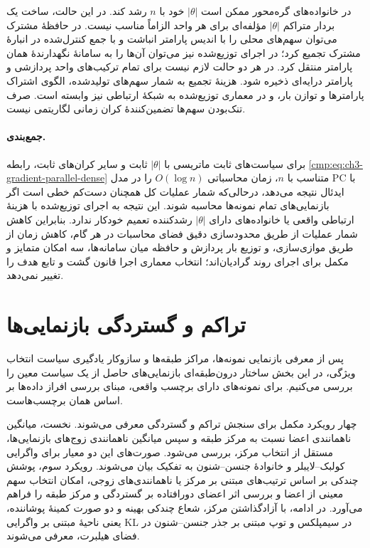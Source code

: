 در خانواده‌های گره‌محور ممکن است $|\theta|$ خود
با $n$ رشد کند. در این حالت، ساخت یک بردار
متراکم $|\theta|$ مؤلفه‌ای برای هر واحد
الزاماً مناسب نیست. در حافظهٔ مشترک می‌توان
سهم‌های محلی را با اندیس پارامتر انباشت
و با جمع کنترل‌شده در انبارهٔ مشترک تجمیع کرد؛
در اجرای توزیع‌شده نیز می‌توان آن‌ها را به
سامانهٔ نگهدارندهٔ همان پارامتر منتقل کرد.
در هر دو حالت لازم نیست برای تمام ترکیب‌های
واحد پردازشی و پارامتر درایه‌ای ذخیره شود.
هزینهٔ تجمیع به شمار سهم‌های تولیدشده،
الگوی اشتراک پارامترها و توازن بار، و در
معماری توزیع‌شده به شبکهٔ ارتباطی نیز
وابسته است. صرف تنک‌بودن سهم‌ها تضمین‌کنندهٔ
کران زمانی لگاریتمی نیست.

\paragraph{جمع‌بندی.}
برای سیاست‌های ثابت ماتریسی با $|\theta|$ ثابت
و سایر کران‌های ثابت، رابطه
\eqref{cmp:eq:ch3-gradient-parallel-dense}
با $\mathrm{PC}$ متناسب با $n$،
زمان محاسباتی $O(\log n)$ را در مدل
ایدئال نتیجه می‌دهد، درحالی‌که شمار
عملیات کل همچنان دست‌کم خطی است اگر
بازنمایی‌های تمام نمونه‌ها محاسبه شوند.
این نتیجه به اجرای توزیع‌شده با هزینهٔ
ارتباطی واقعی یا خانواده‌های دارای
$|\theta|$ رشدکننده تعمیم خودکار ندارد.
بنابراین کاهش شمار عملیات از طریق
محدودسازی دقیق فضای محاسبات در هر گام،
کاهش زمان از طریق موازی‌سازی، و توزیع
بار پردازش و حافظه میان سامانه‌ها، سه
امکان متمایز و مکمل برای اجرای روند
گرادیان‌اند؛ انتخاب معماری اجرا قانون
گشت و تابع هدف را تغییر نمی‌دهد.

\section{تراکم و گستردگی بازنمایی‌ها}
\label{cmp:sec:ch3-quality-criteria}

پس از معرفی بازنمایی نمونه‌ها، مراکز طبقه‌ها و سازوکار
یادگیری سیاست انتخاب ویژگی، در این بخش ساختار
درون‌طبقه‌ای بازنمایی‌های حاصل از یک سیاست معین را
بررسی می‌کنیم. برای نمونه‌های دارای برچسب واقعی،
مبنای بررسی افراز داده‌ها بر اساس همان برچسب‌هاست.

چهار رویکرد مکمل برای سنجش تراکم و گستردگی معرفی
می‌شوند. نخست، میانگین ناهمانندی اعضا نسبت به مرکز
طبقه و سپس میانگین ناهمانندی زوج‌های بازنمایی‌ها،
مستقل از انتخاب مرکز، بررسی می‌شود. صورت‌های این
دو معیار برای واگرایی کولبک--لایبلر و خانوادهٔ
جنسن--شنون به تفکیک بیان می‌شوند. رویکرد سوم،
پوشش چندکی بر اساس ترتیب‌های مبتنی بر مرکز یا
ناهمانندی‌های زوجی، امکان انتخاب سهم معینی از اعضا
و بررسی اثر اعضای دورافتاده بر گستردگی و مرکز طبقه
را فراهم می‌آورد. در ادامه، با آزادگذاشتن مرکز،
شعاع چندکی بهینه و دو صورت کمینهٔ پوشاننده، یعنی
ناحیهٔ مبتنی بر واگرایی KL در سیمپلکس و توپ
مبتنی بر جذر جنسن--شنون در فضای هیلبرت، معرفی
می‌شوند.

